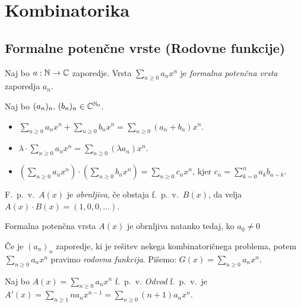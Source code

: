\section{Kombinatorika}
\subsection{Formalne potenčne vrste (Rodovne funkcije)}
\begin{definicija}
    Naj bo $a: \mathbb{N} \to \mathbb{C}$ zaporedje. Vrsta $\sum_{n \geq 0}a_n x^n$ je \emph{formalna potenčna vrsta} zaporedja $a_n$.
\end{definicija}

\begin{definicija}
    Naj bo $(a_n)_n, \, (b_n)_n \in \mathbb{C}^{\mathbb{N}_0}$.
    \begin{itemize}
        \item $\sum_{n \geq 0}a_n x^n + \sum_{n \geq 0}b_n x^n = \sum_{n \geq 0}(a_n + b_n) x^n$.
        \item $\lambda \cdot \sum_{n \geq 0}a_n x^n = \sum_{n \geq 0}(\lambda a_n) x^n$.
        \item $(\sum_{n \geq 0}a_n x^n) \cdot (\sum_{n \geq 0}b_n x^n) = \sum_{n \geq 0}c_n x^n$, kjer $c_n = \sum_{k=0}^{n}a_kb_{n-k}$.
    \end{itemize}
\end{definicija}

\begin{definicija}
    F.\ p.\ v.\ $A(x)$ je \emph{obrnljiva}, če obstaja f.\ p.\ v.\ $B(x)$, da velja $A(x) \cdot B(x) = (1, 0, 0, \ldots)$.
\end{definicija}

\begin{trditev}
    Formalna potenčna vrsta $A(x)$ je obrnljiva natanko tedaj, ko $a_0 \neq 0$
\end{trditev}

\begin{definicija}
    Če je $(a_n)_n$ zaporedje, ki je rešitev nekega kombinatoričnega problema, potem $\sum_{n \geq 0}a_n x^n$ pravimo \emph{rodovna funkcija}. Pišemo: $G(x) = \sum_{n \geq 0}a_n x^n$.
\end{definicija}

\begin{definicija}
    Naj bo $A(x) = \sum_{n \geq 0}a_n x^n$ f.\ p.\ v. \emph{Odvod} f.\ p.\ v.\ je $A'(x) =  \sum_{n \geq 1}na_n x^{n-1} =  \sum_{n \geq 0}(n+1)a_n x^n$.
\end{definicija}

